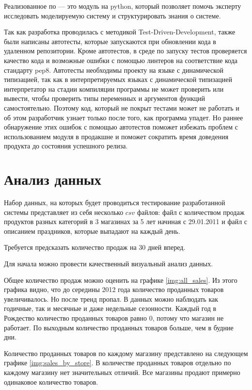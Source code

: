 Реализованное по --- это модуль на python, который позволяет помочь эксперту
исследовать моделируемую систему и структурировать знания о системе.

Так как разработка проводилась с методикой Test-Driven-Development,
также были написаны автотесты, которые запускаются
при обновлении кода в удаленном репозитории. Кроме автотестов,
в среде по запуску тестов проверяется качество кода и возможные ошибки
с помощью линтеров на соответствие кода стандарту pep8.
Автотесты необходимы проекту на языке с динамической типизацией,
так как в интерпретируемых языках с динамической типизацией
интерпретатор на стадии компиляции программы не может проверить или вывести, чтобы проверить
типы переменных и аргументов функций самостоятельно. Поэтому код, который
не покрыт тестами может не работать и об этом разработчик узнает
только после того, как программа упадет. Но раннее обнаружение этих
ошибок с помощью автотестов поможет избежать проблем с использованием модуля в
продакшне и поможет сократить время доведения продукта до состояния успешного релиза.

\section{Анализ данных}

Набор данных, на которых будет проводиться тестирование разработанной системы
представляет из себя несколько $ csv $ файлов: файл с количеством продаж
продуктов разных категорий в 3 магазинах за 5 лет начиная с 29.01.2011
и файл с описанием праздников, которые выпадают на каждый день.

Требуется предсказать количество продаж на 30 дней вперед.

Для начала можно провести качественный визуальный анализ данных.

Общее количество продаж можно оценить на графике \ref{img:all_sales}.
Из этого графика видно, что до середины 2012 года количество проданных
товаров увеличивалось. Но после тренд пропал. В данных можно наблюдать
как годичные, так и месячные и даже недельные сезонности. Каждый год
в Рождество количество проданных товаров равно 0, потому что магазин не работает.
По выходным количество проданных товаров больше, чем в будние дни.

Количество проданных товаров по каждому магазину представлено на следующем графике \ref{img:sales_by_store}.
В количестве проданных товаров отдельно по каждому магазину нет значительных отличий.
Все магазины продают примерно одинаковое количество товаров.


